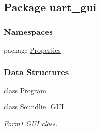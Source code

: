 \hypertarget{namespaceuart__gui}{\subsection{Package uart\-\_\-gui}
\label{namespaceuart__gui}
}
\subsubsection*{Namespaces}
\begin{DoxyCompactItemize}
\item 
package \hyperlink{namespaceuart__gui_1_1_properties}{Properties}
\end{DoxyCompactItemize}
\subsubsection*{Data Structures}
\begin{DoxyCompactItemize}
\item 
class \hyperlink{classuart__gui_1_1_program}{Program}
\item 
class \hyperlink{classuart__gui_1_1_soundlie___g_u_i}{Soundlie\-\_\-\-G\-U\-I}
\begin{DoxyCompactList}\small\item\em Form1 G\-U\-I class. \end{DoxyCompactList}\end{DoxyCompactItemize}
